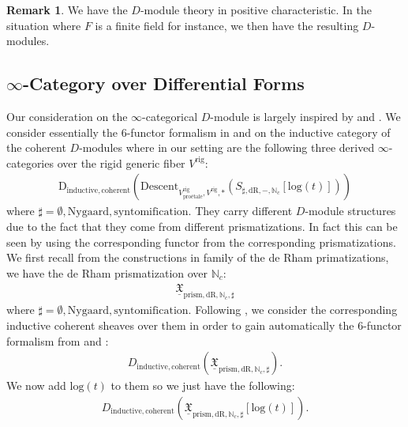\documentclass[12pt]{article}
\theoremstyle{definition}
\newtheorem{remark}{Remark}
\begin{document}
\begin{remark}
We have the $D$-module theory in positive characteristic. In the situation where $F$ is a finite field for instance, we then have the resulting $D$-modules.
\end{remark}






\subsection{$\infty$-Category over Differential Forms}

Our consideration on the $\infty$-categorical $D$-module is largely inspired by \cite{5GR1} and \cite{5GR2}. We consider essentially the 6-functor formalism in \cite{5GR1} and \cite{5GR2} on the inductive category of the coherent $D$-modules where in our setting are the following three derived $\infty$-categories over the rigid generic fiber $V^\mathrm{rig}$:
\begin{align}
\mathrm{D}_{\mathrm{inductive},\mathrm{coherent}}(\mathrm{Descent}_{V^\mathrm{rig}_\text{pro\'etale},V^\mathrm{rig},*}(S_{\sharp,\mathrm{dR},-,\mathbb{N}_c}[\mathrm{log}(t)]))
\end{align}
where $\sharp=\emptyset,\mathrm{Nygaard},\mathrm{syntomification}$. They carry different $D$-module structures due to the fact that they come from different prismatizations. In fact this can be seen by using the corresponding functor from the corresponding prismatizations. We first recall from the constructions in family of the de Rham primatizations, we have the de Rham prismatization over $\mathbb{N}_c$:
\begin{align}
\underline{\mathfrak{X}}_{\mathrm{prism},\mathrm{dR},\mathbb{N}_c,\sharp}
\end{align}
where $\sharp=\emptyset,\mathrm{Nygaard},\mathrm{syntomification}$. Following \cite{5GR1}, \cite{5GR2} we consider the corresponding inductive coherent sheaves over them in order to gain automatically the 6-functor formalism from \cite{5GR1} and \cite{5GR2}:
\begin{align}
D_{\mathrm{inductive},\mathrm{coherent}}(\underline{\mathfrak{X}}_{\mathrm{prism},\mathrm{dR},\mathbb{N}_c,\sharp}).
\end{align}
We now add $\mathrm{log}(t)$ to them so we just have the following:
\begin{align}
D_{\mathrm{inductive},\mathrm{coherent}}(\underline{\mathfrak{X}}_{\mathrm{prism},\mathrm{dR},\mathbb{N}_c,\sharp}[\mathrm{log}(t)]).
\end{align}
\end{document}
